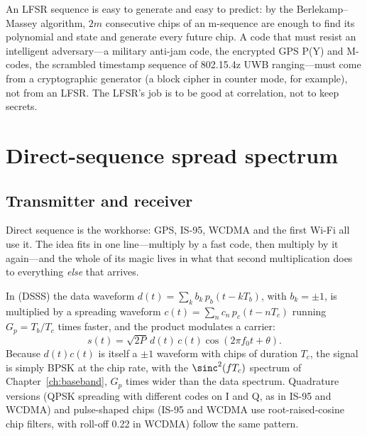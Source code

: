 \begin{pitfall}
An LFSR sequence is easy to generate and easy to predict: by the Berlekamp--Massey algorithm,
$2m$ consecutive chips of an m-sequence are enough to find its polynomial and state and
generate every future chip. A code that must resist an intelligent adversary---a military
anti-jam code, the encrypted GPS P(Y) and M-codes, the scrambled timestamp sequence of
802.15.4z UWB ranging---must come from a cryptographic generator (a block cipher in counter
mode, for example), not from an LFSR. The LFSR's job is to be good at correlation, not to
keep secrets.
\end{pitfall}

\section{Direct-sequence spread spectrum}
\label{sec:ch18:dsss}

\subsection{Transmitter and receiver}


Direct sequence is the workhorse: GPS, IS-95, WCDMA and the first Wi-Fi all use it. The idea
fits in one line---multiply by a fast code, then multiply by it again---and the whole of its
magic lives in what that second multiplication does to everything \emph{else} that arrives.

In  (DSSS) the data waveform $d(t)=\sum_kb_k\,p_b(t-kT_b)$,
with $b_k=\pm1$, is multiplied by a spreading waveform $c(t)=\sum_nc_n\,p_c(t-nT_c)$ running
$G_p=T_b/T_c$ times faster, and the product modulates a carrier:
\begin{equation}
s(t)=\sqrt{2P}\,d(t)\,c(t)\cos(2\pi f_0t+\theta).
\label{eq:ch18:dsss}
\end{equation}
Because $d(t)c(t)$ is itself a $\pm1$ waveform with chips of duration $T_c$, the signal is
simply BPSK at the chip rate, with the $\sinc^2(fT_c)$ spectrum of
Chapter~\ref{ch:baseband}, $G_p$ times wider than the data spectrum. Quadrature versions
(QPSK spreading with different codes on I and Q, as in IS-95 and WCDMA) and pulse-shaped
chips (IS-95 and WCDMA use root-raised-cosine chip filters, with roll-off 0.22 in WCDMA)
follow the same pattern.

